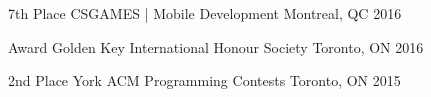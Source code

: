 






\begin{cvhonors}


\cvhonor
{7th Place} %
{CSGAMES | Mobile Development} %
{Montreal, QC} %
{2016} %


\cvhonor
{Award} %
{Golden Key International Honour Society} %
{Toronto, ON} %
{2016} %


\cvhonor
{2nd Place} %
{York ACM Programming Contests} %
{Toronto, ON} %
{2015} %

\end{cvhonors}
